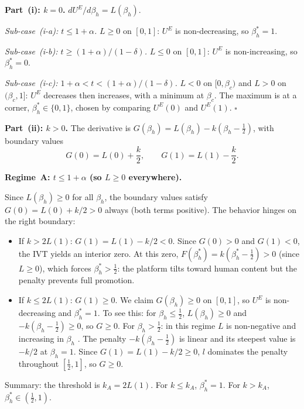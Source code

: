 \documentclass[mnsc,nonblindrev]{informs3_NoOR}
\begin{document}
\medskip\noindent\textbf{Part~(i): $k = 0$.}
$dU^E/d\beta_h = L(\beta_h)$.

 
\emph{Sub-case~(i-a): $t \leq 1+\alpha$.}
$L \geq 0$ on $[0,1]$: $U^E$ is non-decreasing, so $\beta_h^* = 1$.
 
\emph{Sub-case~(i-b): $t \geq (1+\alpha)/(1-\delta)$.}
$L \leq 0$ on $[0,1]$: $U^E$ is non-increasing, so $\beta_h^* = 0$.
 
\emph{Sub-case~(i-c): $1+\alpha < t < (1+\alpha)/(1-\delta)$.}
$L < 0$ on $[0,\beta_c)$ and $L > 0$ on $(\beta_c,1]$: $U^E$ decreases then increases, with a minimum at $\beta_c$. The maximum is at a corner, $\beta_h^* \in \{0,1\}$, chosen by comparing $U^E(0)$ and $U^E(1)$. \hfill$\square$

 
\medskip\noindent\textbf{Part~(ii): $k > 0$.}
The derivative is $G(\beta_h) = L(\beta_h) - k(\beta_h - \tfrac{1}{2})$, with boundary values
\[
G(0) = L(0) + \frac{k}{2}, \qquad G(1) = L(1) - \frac{k}{2}.
\]

 
\medskip\noindent\textbf{Regime~A: $t \leq 1 + \alpha$ (so $L \geq 0$ everywhere).}
 
Since $L(\beta_h) \geq 0$ for all $\beta_h$, the boundary values satisfy $G(0) = L(0) + k/2 > 0$ always (both terms positive). The behavior hinges on the right boundary:
\begin{itemize}
\item If $k > 2L(1)$: $G(1) = L(1) - k/2 < 0$. Since $G(0) > 0$ and $G(1) < 0$, the IVT yields an interior zero. At this zero, $F(\beta_h^*) = k(\beta_h^* - \frac{1}{2}) > 0$ (since $L \geq 0$), which forces $\beta_h^* > \frac{1}{2}$: the platform tilts toward human content but the penalty prevents full promotion.
 
\item If $k \leq 2L(1)$: $G(1) \geq 0$. We claim $G(\beta_h) \geq 0$ on $[0,1]$, so $U^E$ is non-decreasing and $\beta_h^* = 1$. To see this: for $\beta_h \leq \frac{1}{2}$, $L(\beta_h) \geq 0$ and $-k(\beta_h - \frac{1}{2}) \geq 0$, so $G \geq 0$. For $\beta_h > \frac{1}{2}$: in this regime $L$ is non-negative and increasing in $\beta_h$ . The penalty $-k(\beta_h - \frac{1}{2})$ is linear and its steepest value is $-k/2$ at $\beta_h = 1$. Since $G(1) = L(1) - k/2 \geq 0$, $l$ dominates the penalty throughout $[\frac{1}{2}, 1]$, so $G \geq 0$.
\end{itemize}
 
Summary: the threshold is $k_A = 2L(1)$. For $k \leq k_A$, $\beta_h^* = 1$. For $k > k_A$, $\beta_h^* \in (\frac{1}{2}, 1)$.
 
\end{document}
